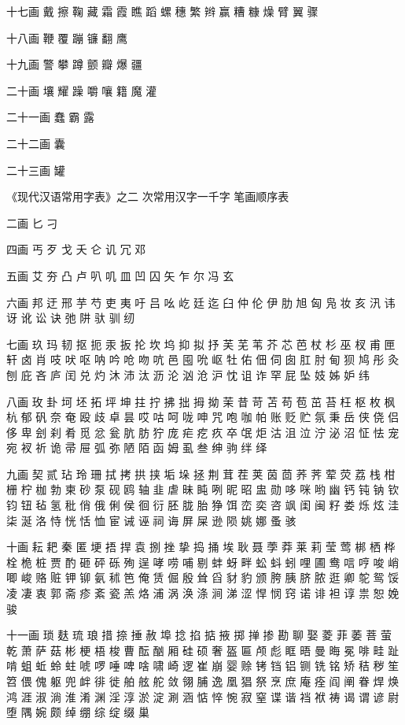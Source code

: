 {		十七画
		戴 擦 鞠 藏 霜 霞 瞧 蹈 螺 穗 繁 辫 赢 糟 糠 燥 臂 翼 骤
		
		十八画
		鞭 覆 蹦 镰 翻 鹰
		
		十九画
		警 攀 蹲 颤 瓣 爆 疆
		
		二十画
		壤 耀 躁 嚼 嚷 籍 魔 灌
		
		二十一画
		蠢 霸 露
		
		二十二画
		囊
		
		
		二十三画
		罐
		
		
		《现代汉语常用字表》之二
		次常用汉字一千字
		笔画顺序表
		
		二画
		匕 刁
		
		四画
		丐 歹 戈 夭 仑 讥 冗 邓
		
		五画
		艾 夯 凸 卢 叭 叽 皿 凹 囚 矢 乍 尔 冯 玄
		
		六画
		邦 迂 邢 芋 芍 吏 夷 吁 吕 吆 屹 廷 迄 臼 仲 伦 伊 肋 旭 匈 凫 妆 亥
		汛 讳 讶 讹 讼 诀 弛 阱 驮
		驯 纫
		
		七画
		玖 玛 韧 抠 扼 汞 扳 抡 坎 坞 抑 拟 抒 芙 芜 苇 芥 芯 芭 杖 杉 巫 杈
		甫 匣 轩 卤 肖 吱 吠 呕 呐
		吟 呛 吻 吭 邑 囤 吮 岖 牡 佑 佃 伺 囱 肛 肘 甸 狈 鸠 彤 灸 刨 庇 吝
		庐 闰 兑 灼 沐 沛 汰 沥 沦
		汹 沧 沪 忱 诅 诈 罕 屁 坠 妓 姊 妒 纬
		
		八画
		玫 卦 坷 坯 拓 坪 坤 拄 拧 拂 拙 拇 拗 茉 昔 苛 苫 苟 苞 茁 苔 枉 枢
		枚 枫 杭 郁 矾 奈 奄 殴 歧
		卓 昙 哎 咕 呵 咙 呻 咒 咆 咖 帕 账 贬 贮 氛 秉 岳 侠 侥 侣 侈 卑 刽
		刹 肴 觅 忿 瓮 肮 肪 狞 庞
		疟 疙 疚 卒 氓 炬 沽 沮 泣 泞 泌 沼 怔 怯 宠 宛 衩 祈 诡 帚 屉 弧 弥
		陋 陌 函 姆 虱 叁 绅 驹 绊
		绎
		
		九画
		契 贰 玷 玲 珊 拭 拷 拱 挟 垢 垛 拯 荆 茸 茬 荚 茵 茴 荞 荠 荤 荧 荔
		栈 柑 栅 柠 枷 勃 柬 砂 泵
		砚 鸥 轴 韭 虐 昧 盹 咧 昵 昭 盅 勋 哆 咪 哟 幽 钙 钝 钠 钦 钧 钮 毡
		氢 秕 俏 俄 俐 侯 徊 衍 胚
		胧 胎 狰 饵 峦 奕 咨 飒 闺 闽 籽 娄 烁 炫 洼 柒 涎 洛 恃 恍 恬 恤 宦
		诫 诬 祠 诲 屏 屎 逊 陨 姚
		娜 蚤 骇
		
		十画
		耘 耙 秦 匿 埂 捂 捍 袁 捌 挫 挚 捣 捅 埃 耿 聂 荸 莽 莱 莉 莹 莺 梆
		栖 桦 栓 桅 桩 贾 酌 砸 砰
		砾 殉 逞 哮 唠 哺 剔 蚌 蚜 畔 蚣 蚪 蚓 哩 圃 鸯 唁 哼 唆 峭 唧 峻 赂
		赃 钾 铆 氨 秫 笆 俺 赁 倔
		殷 耸 舀 豺 豹 颁 胯 胰 脐 脓 逛 卿 鸵 鸳 馁 凌 凄 衷 郭 斋 疹 紊 瓷
		羔 烙 浦 涡 涣 涤 涧 涕 涩
		悍 悯 窍 诺 诽 袒 谆 祟 恕 娩 骏
		
		十一画
		琐 麸 琉 琅 措 捺 捶 赦 埠 捻 掐 掂 掖 掷 掸 掺 勘 聊 娶 菱 菲 萎 菩
		萤 乾 萧 萨 菇 彬 梗 梧 梭
		曹 酝 酗 厢 硅 硕 奢 盔 匾 颅 彪 眶 晤 曼 晦 冕 啡 畦 趾 啃 蛆 蚯 蛉
		蛀 唬 啰 唾 啤 啥 啸 崎 逻
		崔 崩 婴 赊 铐 铛 铝 铡 铣 铭 矫 秸 秽 笙 笤 偎 傀 躯 兜 衅 徘 徙 舶
		舷 舵 敛 翎 脯 逸 凰 猖 祭
		烹 庶 庵 痊 阎 阐 眷 焊 焕 鸿 涯 淑 淌 淮 淆 渊 淫 淳 淤 淀 涮 涵 惦
		悴 惋 寂 窒 谍 谐 裆 袱 祷
		谒 谓 谚 尉 堕 隅 婉 颇 绰 绷 综 绽 缀 巢
		
}
